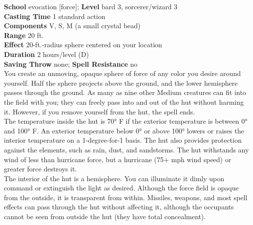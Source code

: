 \textbf{School} evocation [force]; \textbf{Level} bard 3, sorcerer/wizard 3\\
\textbf{Casting Time} 1 standard action\\
\textbf{Components} V, S, M (a small crystal bead)\\
\textbf{Range} 20 ft.\\
\textbf{Effect} 20-ft.-radius sphere centered on your location\\
\textbf{Duration} 2 hours/level (D)\\
\textbf{Saving Throw} none; \textbf{Spell Resistance} no\\
You create an unmoving, opaque sphere of force of any color you desire around yourself. Half the sphere projects above the ground, and the lower hemisphere passes through the ground. As many as nine other Medium creatures can fit into the field with you; they can freely pass into and out of the hut without harming it. However, if you remove yourself from the hut, the spell ends.\\
The temperature inside the hut is 70° F if the exterior temperature is between 0° and 100° F. An exterior temperature below 0° or above 100° lowers or raises the interior temperature on a 1-degree-for-1 basis. The hut also provides protection against the elements, such as rain, dust, and sandstorms. The hut withstands any wind of less than hurricane force, but a hurricane (75+ mph wind speed) or greater force destroys it.\\
The interior of the hut is a hemisphere. You can illuminate it dimly upon command or extinguish the light as desired. Although the force field is opaque from the outside, it is transparent from within. Missiles, weapons, and most spell effects can pass through the hut without affecting it, although the occupants cannot be seen from outside the hut (they have total concealment).\\
